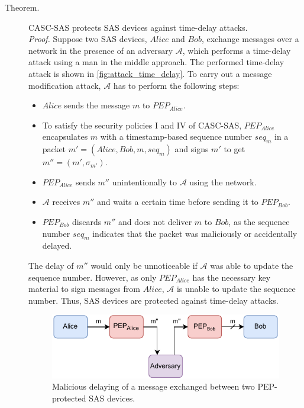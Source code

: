 \begin{description}
    \item[Theorem.] CASC-SAS protects SAS devices against time-delay attacks.\\
    \textit{Proof.} Suppose two SAS devices, $Alice$ and $Bob$, exchange messages over a network in the presence of an adversary $\mathcal{A}$, which performs a time-delay attack using a man in the middle approach.
    The performed time-delay attack is shown in \autoref{fig:attack_time_delay}.
    To carry out a message modification attack, $\mathcal{A}$ has to perform the following steps:
    \begin{itemize}
        \item $Alice$ sends the message $m$ to $PEP_{Alice}$.
        \item To satisfy the security policies I and IV of CASC-SAS, $PEP_{Alice}$ encapsulates $m$ with a timestamp-based sequence number $seq_m$ in a packet $m' = (Alice,\allowbreak Bob,\allowbreak m,\allowbreak seq_m)$ and signs $m'$ to get $m'' = (m', \sigma_{m'})$.
        \item $PEP_{Alice}$ sends $m''$ unintentionally to $\mathcal{A}$ using the network.
        \item $\mathcal{A}$ receives $m''$ and waits a certain time before sending it to $PEP_{Bob}$.
        \item $PEP_{Bob}$ discards $m''$ and does not deliver $m$ to $Bob$, as the sequence number $seq_m$ indicates that the packet was maliciously or accidentally delayed.
    \end{itemize}
    The delay of $m''$ would only be unnoticeable if $\mathcal{A}$ was able to update the sequence number.
    However, as only $PEP_{Alice}$ has the necessary key material to sign messages from $Alice$, $\mathcal{A}$ is unable to update the sequence number.
    Thus, SAS devices are protected against time-delay attacks.
    \begin{figure}
        \centering
        \includegraphics[width=0.75\linewidth]{figures/attack_time_delay.drawio.pdf}
        \caption{Malicious delaying of a message exchanged between two PEP-protected SAS devices.}
        \label{fig:attack_time_delay}
    \end{figure}
\end{description}

